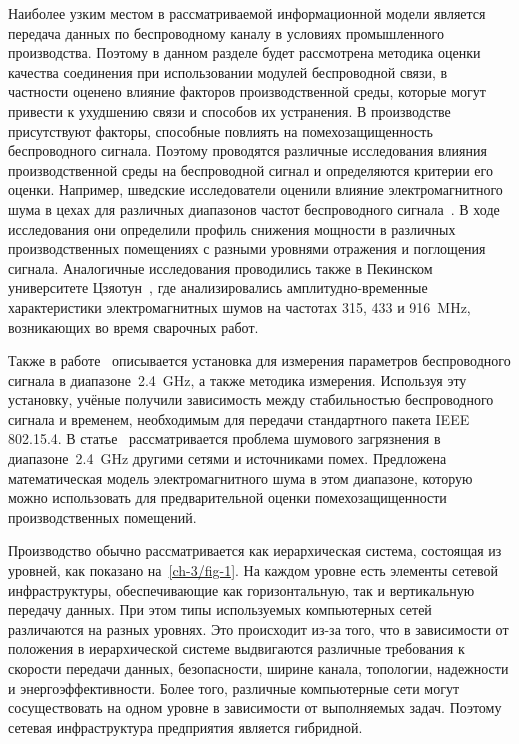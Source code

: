 Наиболее узким местом в рассматриваемой информационной модели является передача данных по беспроводному каналу в условиях промышленного производства. Поэтому в данном разделе будет рассмотрена методика оценки качества соединения при использовании модулей беспроводной связи, в частности оценено влияние факторов производственной среды, которые могут привести к ухудшению связи и способов их устранения. В производстве присутствуют факторы, способные повлиять на помехозащищенность беспроводного сигнала. Поэтому проводятся различные исследования влияния производственной среды на беспроводной сигнал и определяются критерии его оценки. Например, шведские исследователи оценили влияние электромагнитного шума в цехах для различных диапазонов частот беспроводного сигнала~\cite{6525614, 5475862}. В ходе исследования они определили профиль снижения мощности в различных производственных помещениях с разными уровнями отражения и поглощения сигнала. Аналогичные исследования проводились также в Пекинском университете Цзяотун~\cite{Li2019}, где анализировались амплитудно-временные характеристики электромагнитных шумов на частотах 315, 433 и \SI{916}{\mega\hertz}, возникающих во время сварочных работ.
	
Также в работе~\cite{Girs2013DesignOC} описывается установка для измерения параметров беспроводного сигнала в диапазоне~\SI{2,4}{\giga\hertz}, а также методика измерения. Используя эту установку, учёные получили зависимость между стабильностью беспроводного сигнала и временем, необходимым для передачи стандартного пакета IEEE 802.15.4. В статье~\cite{8308609} рассматривается проблема шумового загрязнения в диапазоне~\SI{2,4}{\giga\hertz} другими сетями и источниками помех. Предложена математическая модель электромагнитного шума в этом диапазоне, которую можно использовать для предварительной оценки помехозащищенности производственных помещений.

Производство обычно рассматривается как иерархическая система, состоящая из уровней, как показано на~\cref{ch-3/fig-1}. На каждом уровне есть элементы сетевой инфраструктуры, обеспечивающие как горизонтальную, так и вертикальную передачу данных.
При этом типы используемых компьютерных сетей различаются на разных уровнях. Это происходит из-за того, что в зависимости от положения в иерархической системе выдвигаются различные требования к скорости передачи данных, безопасности, ширине канала, топологии, надежности и энергоэффективности. Более того, различные компьютерные сети могут сосуществовать на одном уровне в зависимости от выполняемых задач. Поэтому сетевая инфраструктура предприятия является гибридной.

